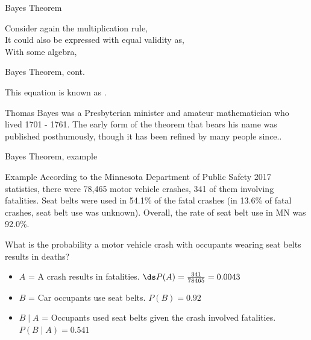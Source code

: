 \documentclass[xcolor=table, aspectratio=169, bigger]{beamer}
\begin{document}
\begin{frame}{Bayes Theorem}

\begin{block}{}
Consider again the multiplication rule,\\ \smallskip
{} \medskip
\pause
It could also be expressed with equal validity as,\\ \smallskip
{} \medskip
\pause
With some algebra, \\ \smallskip
{} \smallskip
\pause
{}
\end{block}
\end{frame}

\begin{frame}{Bayes Theorem, cont.}

\begin{block}{}
 \medskip

This equation is known as .
\end{block}

\begin{exampleblock}{}
Thomas Bayes was a Presbyterian minister and amateur mathematician who lived 1701 - 1761. The early form of the theorem that bears his name was published posthumously, though it has been refined by many people since..
\end{exampleblock}
\end{frame}

\begin{frame}{Bayes Theorem, example}
\begin{exampleblock}{Example}
According to the Minnesota Department of Public Safety 2017 statistics, there were 78,465 motor vehicle crashes, 341 of them involving fatalities. Seat belts were used in 54.1\% of the fatal crashes (in 13.6\% of fatal crashes, seat belt use was unknown). Overall, the rate of seat belt use in MN was 92.0\%. \\ 
\medskip

What is the probability a motor vehicle crash with occupants wearing seat belts results in deaths?

\begin{itemize}
\pause\item $A$ = A crash results in fatalities. $\ds P(A) = \frac{341}{78465} = 0.0043$

\pause\item $B$ = Car occupants use seat belts. $P(B) = 0.92$

\pause\item $B \mid A$ = Occupants used seat belts given the crash involved fatalities.\\ \smallskip
$P(B \mid A) = 0.541$
\end{itemize}

\end{exampleblock}
\end{frame}
\end{document}
